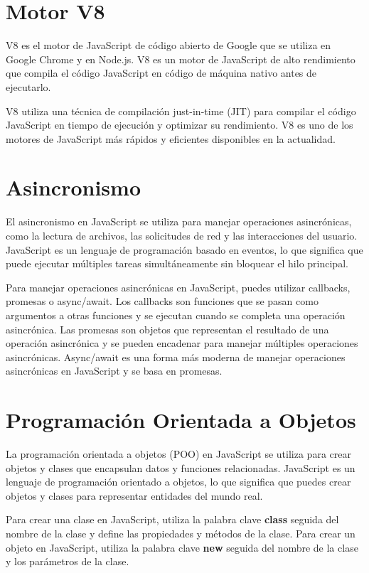 \documentclass[
  a4paper,
  DIV=11,
  numbers=noendperiod,
  onepage,
  openany]{scrreprt}
\begin{document}
\section{Motor V8}\label{motor-v8}

V8 es el motor de JavaScript de código abierto de Google que se utiliza
en Google Chrome y en Node.js. V8 es un motor de JavaScript de alto
rendimiento que compila el código JavaScript en código de máquina nativo
antes de ejecutarlo.

V8 utiliza una técnica de compilación just-in-time (JIT) para compilar
el código JavaScript en tiempo de ejecución y optimizar su rendimiento.
V8 es uno de los motores de JavaScript más rápidos y eficientes
disponibles en la actualidad.

\section{Asincronismo}\label{asincronismo}

El asincronismo en JavaScript se utiliza para manejar operaciones
asincrónicas, como la lectura de archivos, las solicitudes de red y las
interacciones del usuario. JavaScript es un lenguaje de programación
basado en eventos, lo que significa que puede ejecutar múltiples tareas
simultáneamente sin bloquear el hilo principal.

Para manejar operaciones asincrónicas en JavaScript, puedes utilizar
callbacks, promesas o async/await. Los callbacks son funciones que se
pasan como argumentos a otras funciones y se ejecutan cuando se completa
una operación asincrónica. Las promesas son objetos que representan el
resultado de una operación asincrónica y se pueden encadenar para
manejar múltiples operaciones asincrónicas. Async/await es una forma más
moderna de manejar operaciones asincrónicas en JavaScript y se basa en
promesas.

\section{Programación Orientada a
Objetos}\label{programaciuxf3n-orientada-a-objetos-1}

La programación orientada a objetos (POO) en JavaScript se utiliza para
crear objetos y clases que encapsulan datos y funciones relacionadas.
JavaScript es un lenguaje de programación orientado a objetos, lo que
significa que puedes crear objetos y clases para representar entidades
del mundo real.

Para crear una clase en JavaScript, utiliza la palabra clave
\textbf{class} seguida del nombre de la clase y define las propiedades y
métodos de la clase. Para crear un objeto en JavaScript, utiliza la
palabra clave \textbf{new} seguida del nombre de la clase y los
parámetros de la clase.
\end{document}
